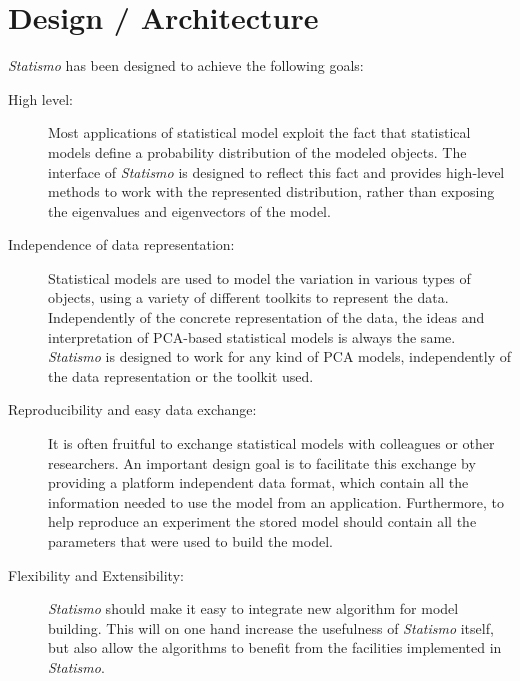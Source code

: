 \documentclass{InsightArticle}
\newcommand{\Statismo}{\emph{Statismo}\xspace}
\begin{document}
\section{Design / Architecture}
\Statismo has been designed to achieve the following goals:
\begin{description}
\item[High level:] Most applications of statistical model exploit the
  fact that statistical models define a probability distribution of
  the modeled objects. The interface of \Statismo is designed to reflect this fact and provides
  high-level methods to work with the represented distribution, rather than 
  exposing the eigenvalues and eigenvectors of the model. 
\item[Independence of data representation:] 
  Statistical models are used to model the variation in various types of objects, using a variety of 
  different toolkits to represent the data. Independently of the concrete representation of the data, 
  the ideas and interpretation of PCA-based  statistical models is always the same. 
  \Statismo is designed to work for any kind of PCA models, independently of the data representation or the toolkit used. 
\item[Reproducibility and easy data exchange:] 
  It is often fruitful to exchange statistical models with colleagues or other researchers. 
  An important design goal is to facilitate this exchange by providing a platform independent data format, 
  which contain all the information needed to use the model from an application. 
  Furthermore, to help reproduce an experiment the stored model should contain all the parameters
  that were used to build the model. 
\item[Flexibility and Extensibility:] 
  \Statismo should make it easy to integrate new algorithm for model building. 
  This will on one hand increase the usefulness of \Statismo itself, but also 
  allow the algorithms to benefit from the facilities implemented in \Statismo. 
\end{description}
\end{document}
